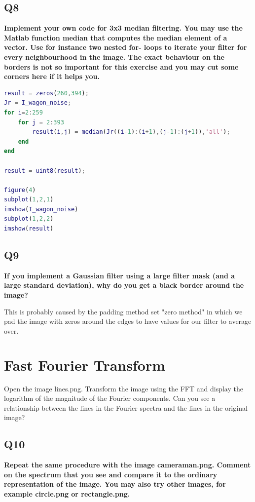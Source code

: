 \documentclass[oneside,a4paper]{article}
\begin{document}
\subsection*{Q8}
\noindent \textbf{Implement your own code for 3x3 median filtering. You may use the Matlab function median that computes the median element of a vector. Use for instance two nested for- loops to iterate your filter for every neighbourhood in the image. The exact behaviour on the borders is not so important for this exercise and you may cut some corners here if it helps you.}
\begin{lstlisting}[language=MATLAB]
result = zeros(260,394);
Jr = I_wagon_noise;
for i=2:259
    for j = 2:393
        result(i,j) = median(Jr((i-1):(i+1),(j-1):(j+1)),'all');   
    end
end

result = uint8(result);

figure(4)
subplot(1,2,1)
imshow(I_wagon_noise)
subplot(1,2,2)
imshow(result)

\end{lstlisting}

\subsection*{Q9}
\noindent \textbf{If you implement a Gaussian filter using a large filter mask (and a large standard deviation), why do you get a black border around the image?}

This is probably caused by the padding method set "zero method" in which we pad the image with zeros around the edges to have values for our filter to average over.  

\newpage

\section{Fast Fourier Transform }
\noindent Open the image lines.png. Transform the image using the FFT and display the logarithm of the magnitude of the Fourier components. Can you see a relationship between the lines in the Fourier spectra and the lines in the original image? 


\subsection*{Q10}
\noindent \textbf{Repeat the same procedure with the image cameraman.png. Comment on the spectrum that you see and compare it to the ordinary representation of the image. You may also try other images, for example circle.png or rectangle.png.}
\end{document}
